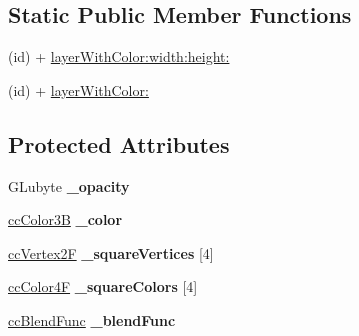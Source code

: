 \subsection*{Static Public Member Functions}
\begin{DoxyCompactItemize}
\item 
(id) + \hyperlink{interface_c_c_layer_color_ab41e7292f1c55d7e1f10855f548d1c9d}{layer\-With\-Color\-:width\-:height\-:}
\item 
(id) + \hyperlink{interface_c_c_layer_color_a392bb74c3a0e7407fe72f0815543b82b}{layer\-With\-Color\-:}
\end{DoxyCompactItemize}
\subsection*{Protected Attributes}
\begin{DoxyCompactItemize}
\item 
\hypertarget{interface_c_c_layer_color_a0d1f4846b379281ac2c190fa41534ee2}{G\-Lubyte {\bfseries \-\_\-opacity}}\label{interface_c_c_layer_color_a0d1f4846b379281ac2c190fa41534ee2}

\item 
\hypertarget{interface_c_c_layer_color_a7df7fe27c31087e89b877bb998bc0074}{\hyperlink{cc_types_8h_a829b00c53e72f0115e3880cb508fec1e}{cc\-Color3\-B} {\bfseries \-\_\-color}}\label{interface_c_c_layer_color_a7df7fe27c31087e89b877bb998bc0074}

\item 
\hypertarget{interface_c_c_layer_color_aa20629097c7db4ad31b68d4473cea8d7}{\hyperlink{cc_types_8h_a3d0a9a02a1f9787a9ede91b9a74bf41f}{cc\-Vertex2\-F} {\bfseries \-\_\-square\-Vertices} \mbox{[}4\mbox{]}}\label{interface_c_c_layer_color_aa20629097c7db4ad31b68d4473cea8d7}

\item 
\hypertarget{interface_c_c_layer_color_a904f33c9a73e347ab919aebc9482697a}{\hyperlink{cc_types_8h_aecc18290defe020343f1d7bb2ee73145}{cc\-Color4\-F} {\bfseries \-\_\-square\-Colors} \mbox{[}4\mbox{]}}\label{interface_c_c_layer_color_a904f33c9a73e347ab919aebc9482697a}

\item 
\hypertarget{interface_c_c_layer_color_a5be0f078fbd6460989eae5771f441a54}{\hyperlink{cc_types_8h_a8c19c6f67219ecc0a6e4740cc046008d}{cc\-Blend\-Func} {\bfseries \-\_\-blend\-Func}}\label{interface_c_c_layer_color_a5be0f078fbd6460989eae5771f441a54}

\end{DoxyCompactItemize}

